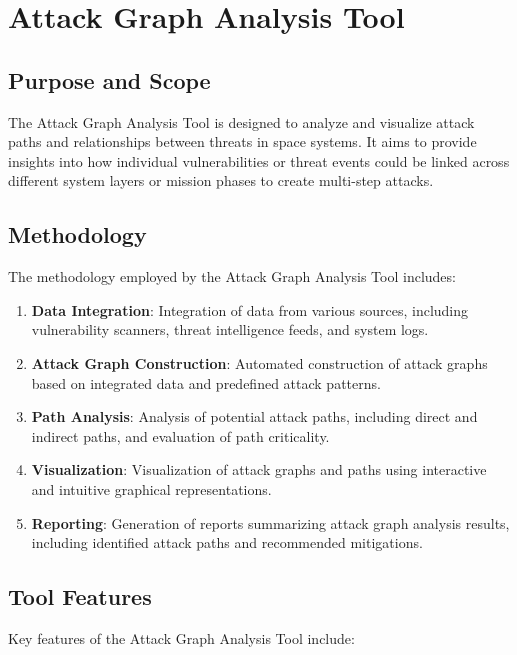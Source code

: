 \documentclass[binding=0.6cm]{sapthesis}
\begin{document}
\section{Attack Graph Analysis Tool}

\subsection{Purpose and Scope}

The Attack Graph Analysis Tool is designed to analyze and visualize attack paths and relationships between threats in space systems. It aims to provide insights into how individual vulnerabilities or threat events could be linked across different system layers or mission phases to create multi-step attacks.

\subsection{Methodology}

The methodology employed by the Attack Graph Analysis Tool includes:

\begin{enumerate}
    \item \textbf{Data Integration}: Integration of data from various sources, including vulnerability scanners, threat intelligence feeds, and system logs.
    \item \textbf{Attack Graph Construction}: Automated construction of attack graphs based on integrated data and predefined attack patterns.
    \item \textbf{Path Analysis}: Analysis of potential attack paths, including direct and indirect paths, and evaluation of path criticality.
    \item \textbf{Visualization}: Visualization of attack graphs and paths using interactive and intuitive graphical representations.
    \item \textbf{Reporting}: Generation of reports summarizing attack graph analysis results, including identified attack paths and recommended mitigations.
\end{enumerate}

\subsection{Tool Features}

Key features of the Attack Graph Analysis Tool include:
\end{document}
